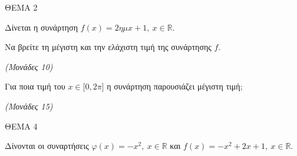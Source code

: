 \documentclass[11pt,a4paper,twoside]{book}
\newcommand{\monades}[1]{\hfill \textit{(Μονάδες #1)}}
\begin{document}
\vspace{4mm}

ΘΕΜΑ 2

Δίνεται η συνάρτηση $f(x) = 2\eta\mu x + 1,\ x\mathbb{\in R}$.

\begin{alist}
\item Να βρείτε τη μέγιστη και την ελάχιστη τιμή της συνάρτησης $f$.

\monades{10}

\item Για ποια τιμή του $x \in \lbrack 0,2\pi\rbrack$ η συνάρτηση παρουσιάζει μέγιστη τιμή;

\monades{15}
\end{alist}

\vspace{4mm}

ΘΕΜΑ 4

Δίνονται οι συναρτήσεις $\varphi(x) = - x^{2},\ x\mathbb{\in R}$ και $f(x) = - x^{2} + 2x + 1,\ x\mathbb{\in R.}$
\end{document}
